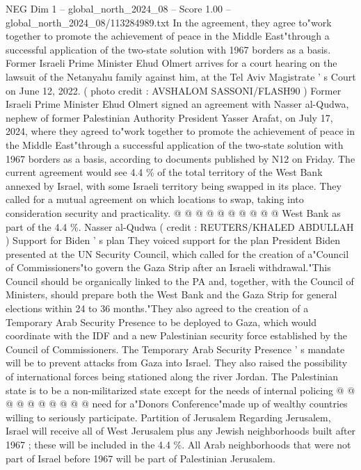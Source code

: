 \begin{textsample}{NEG Dim 1 – global\_north\_2024\_08 – Score 1.00 – global\_north\_2024\_08/113284989.txt}  \label{ex:f1_neg_380}
In the agreement, they agree to"work together to promote the achievement of peace in the Middle East"through a successful application of the two-state solution with 1967 borders as a basis.
Former Israeli Prime Minister Ehud Olmert arrives for a court hearing on the lawsuit of the Netanyahu family against him, at the Tel Aviv Magistrate ' s Court on June 12, 2022. ( photo credit : AVSHALOM SASSONI/FLASH90 ) Former Israeli Prime Minister Ehud Olmert signed an agreement with Nasser al-Qudwa, nephew of former Palestinian Authority President Yasser Arafat, on July 17, 2024, where they agreed to"work together to promote the achievement of peace in the Middle East"through a successful application of the two-state solution with 1967 borders as a basis, according to documents published by N12 on Friday.
The current agreement would see 4.4 \% of the total territory of the West Bank annexed by Israel, with some Israeli territory being swapped in its place.
They called for a mutual agreement on which locations to swap, taking into consideration security and practicality. @ @ @ @ @ @ @ @ @ @ West Bank as part of the 4.4 \%.
Nasser al-Qudwa ( credit : REUTERS/KHALED ABDULLAH ) Support for Biden ' s plan They voiced support for the plan President Biden presented at the UN Security Council, which called for the creation of a"Council of Commissioners"to govern the Gaza Strip after an Israeli withdrawal."This Council should be organically linked to the PA and, together, with the Council of Ministers, should prepare both the West Bank and the Gaza Strip for general elections within 24 to 36 months."They also agreed to the creation of a Temporary Arab Security Presence to be deployed to Gaza, which would coordinate with the IDF and a new Palestinian security force established by the Council of Commissioners.
The Temporary Arab Security Presence ' s mandate will be to prevent attacks from Gaza into Israel.
They also raised the possibility of international forces being stationed along the river Jordan.
The Palestinian state is to be a non-militarized state except for the needs of internal policing @ @ @ @ @ @ @ @ @ @ need for a"Donors Conference"made up of wealthy countries willing to seriously participate.
Partition of Jerusalem Regarding Jerusalem, Israel will receive all of West Jerusalem plus any Jewish neighborhoods built after 1967 ; these will be included in the 4.4 \%.
All Arab neighborhoods that were not part of Israel before 1967 will be part of Palestinian Jerusalem.

\end{textsample}

